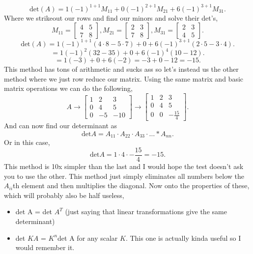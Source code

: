 \documentclass{report}
\begin{document}
\begin{multicols}{2}
\[
\text{det}\left( A \right) = 1\left( -1 \right) ^{ 1+1 }M_{ 11 } + 0\left( -1 \right) ^{ 2+1 }M_{ 21 } + 6\left( -1 \right) ^{ 3+1 }M_{ 31 }
.\] 
Where we strikeout our rows and find our minors and solve their det's,
\[
M_{ 11 } = \begin{bmatrix} 4 & 5 \\ 7 & 8 \end{bmatrix} , M_{ 21 } = \begin{bmatrix} 2 & 3 \\ 7 & 8 \end{bmatrix} , M_{ 31 } = \begin{bmatrix} 2 & 3 \\ 4 & 5 \end{bmatrix}
.\] 
\[
\text{det}\left( A \right) = 1\left( -1 \right) ^{ 1+1 }\left( 4 \cdot 8 - 5 \cdot 7 \right) + 0 + 6\left( -1 \right) ^{ 3+1 }\left( 2 \cdot 5 - 3 \cdot 4 \right) 
.\] 
\[
= 1\left( -1 \right) ^{ 2 }\left( 32 - 35 \right) + 0 + 6\left( -1 \right) ^{ 4 }\left( 10 - 12 \right) 
.\] 
\[
= 1\left( -3 \right) + 0 + 6\left( -2 \right) = -3 + 0 - 12 = -15
.\] 
This method has tons of arithmetic and sucks ass so let's instead us the other method where we just row reduce our matrix. Using the same matrix and basic matrix operations we can do the following,
\[
	A \to \begin{bmatrix} 1 & 2 & 3 \\ 0 & 4 & 5 \\ 0 & -5 & -10 \end{bmatrix} \to \begin{bmatrix} 1 & 2 & 3 \\ 0 & 4 & 5 \\ 0 & 0 & -\frac{ 15 }{ 4 }  \end{bmatrix} 
.\] 
And can now find our determinant as 
\[
\text{det}A = A_{ 11 }\cdot A_{ 22 }\cdot A_{ 33 }\cdot \ldots * A_{ nn } 
.\] 
Or in this case,
\[
\text{det}A= 1\cdot 4\cdot -\frac{ 15 }{ 4 } = -15
.\] 
This method is 10x simpler than the last and I would hope the test doesn't ask you to use the other. This method just simply eliminates all numbers below the $ A_{ ii } $th element and then multiplies the diagonal. Now onto the properties of these, which will probably also be half useless,
\begin{itemize}
	\item det A = det $ A^{ T } $ (just saying that linear transformations give the same determinant)
	\item det $ KA $ = $ K^{ n } $det A for any scalar $ K $. This one is actually kinda useful so I would remember it. 

\end{itemize}
\end{multicols}
\end{document}
